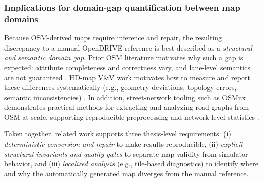 \subsubsection{Implications for domain-gap quantification between map domains}
Because OSM-derived maps require inference and repair, the resulting discrepancy to a manual OpenDRIVE reference is best described as a \emph{structural and semantic domain gap}. Prior OSM literature motivates why such a gap is expected: attribute completeness and correctness vary, and lane-level semantics are not guaranteed \cite{haklay2010osm,barron2014osm}. HD-map V\&V work motivates how to measure and report these differences systematically (e.g., geometry deviations, topology errors, semantic inconsistencies) \cite{chiang2022hdmapvv,opendrive_lanelet2_vv_2023}. In addition, street-network tooling such as OSMnx demonstrates practical methods for extracting and analyzing road graphs from OSM at scale, supporting reproducible preprocessing and network-level statistics \cite{boeing2017osmnx}.

Taken together, related work supports three thesis-level requirements: (i) \emph{deterministic conversion and repair} to make results reproducible, (ii) \emph{explicit structural invariants and quality gates} to separate map validity from simulator behavior, and (iii) \emph{localized analysis} (e.g., tile-based diagnostics) to identify where and why the automatically generated map diverges from the manual reference.
